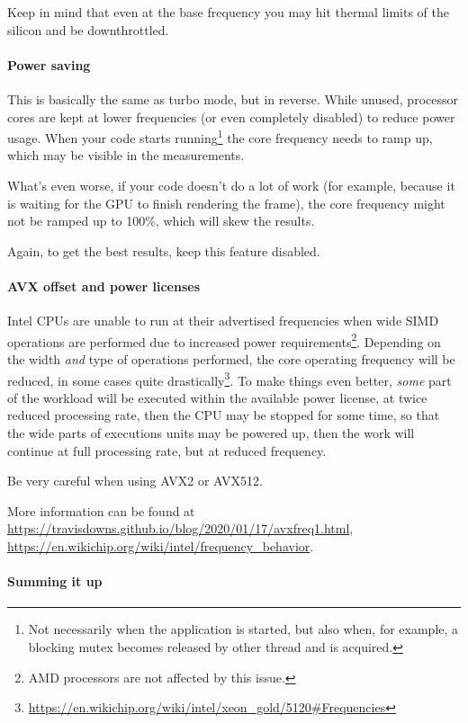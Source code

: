 \documentclass[hidelinks,titlepage,a4paper]{article}
\begin{document}
Keep in mind that even at the base frequency you may hit thermal limits of the silicon and be downthrottled.

\paragraph{Power saving}

This is basically the same as turbo mode, but in reverse. While unused, processor cores are kept at lower frequencies (or even completely disabled) to reduce power usage. When your code starts running\footnote{Not necessarily when the application is started, but also when, for example, a blocking mutex becomes released by other thread and is acquired.} the core frequency needs to ramp up, which may be visible in the measurements.

What's even worse, if your code doesn't do a lot of work (for example, because it is waiting for the GPU to finish rendering the frame), the core frequency might not be ramped up to 100\%, which will skew the results.

Again, to get the best results, keep this feature disabled.

\paragraph{AVX offset and power licenses}

Intel CPUs are unable to run at their advertised frequencies when wide SIMD operations are performed due to increased power requirements\footnote{AMD processors are not affected by this issue.}. Depending on the width \emph{and} type of operations performed, the core operating frequency will be reduced, in some cases quite drastically\footnote{\url{https://en.wikichip.org/wiki/intel/xeon_gold/5120\#Frequencies}}. To make things even better, \emph{some} part of the workload will be executed within the available power license, at twice reduced processing rate, then the CPU may be stopped for some time, so that the wide parts of executions units may be powered up, then the work will continue at full processing rate, but at reduced frequency.

Be very careful when using AVX2 or AVX512.

More information can be found at \url{https://travisdowns.github.io/blog/2020/01/17/avxfreq1.html}, \url{https://en.wikichip.org/wiki/intel/frequency_behavior}.

\paragraph{Summing it up}
\label{ryzen}
\end{document}
